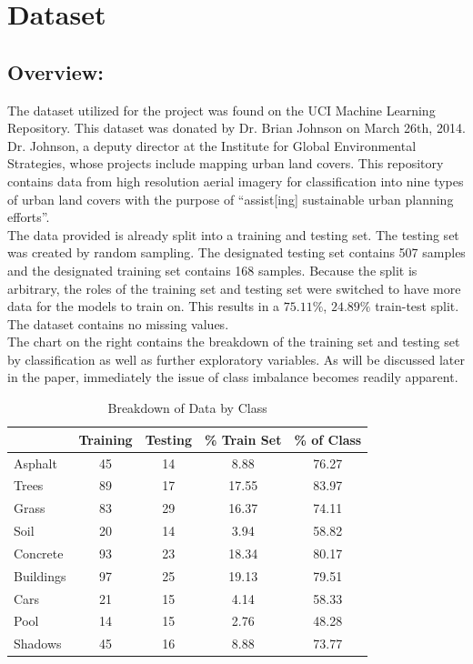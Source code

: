 \documentclass[11pt]{article}
\begin{document}
\section{Dataset}

\subsection{Overview:}
The dataset utilized for the project was found on the UCI Machine Learning Repository. This dataset was donated by Dr. Brian Johnson on March 26th, 2014. Dr. Johnson, a deputy director at the Institute for Global Environmental Strategies, whose projects include mapping urban land covers. This repository contains data from high resolution aerial imagery for classification into nine types of urban land covers with the purpose of  “assist[ing]  sustainable urban planning efforts”.\\

The data provided is already split into a training and testing set. The testing set was created by random sampling. The designated testing set contains 507 samples and the designated training set contains 168 samples. Because the split is arbitrary, the roles of the training set and testing set were switched to have more data for the models to train on. This results in a $75.11\%$, $24.89\%$ train-test split.\\

The dataset contains no missing values.\\

The chart on the right contains the breakdown of the training set and testing set by classification as well as further exploratory variables. As will be discussed later in the paper, immediately the issue of class imbalance becomes readily apparent. 

\begin{table}[h!]
\centering
\begin{tabular}{lcccc}
\hline
& Training & Testing & \% Train Set & \% of Class \\ 
\hline
Asphalt & 45 & 14 & 8.88 & 76.27 \\ 
Trees & 89 & 17 & 17.55 & 83.97 \\ 
Grass & 83 & 29 & 16.37 & 74.11 \\ 
Soil & 20 & 14 & 3.94 & 58.82 \\ 
Concrete & 93 & 23 & 18.34 & 80.17 \\ 
Buildings & 97 & 25 & 19.13 & 79.51 \\ 
Cars & 21 & 15 & 4.14 & 58.33 \\ 
Pool & 14 & 15 & 2.76 & 48.28 \\ 
Shadows & 45 & 16 & 8.88 & 73.77 \\
\hline
\end{tabular}
\caption{Breakdown of Data by Class}
\label{your-label}
\end{table}
\end{document}
